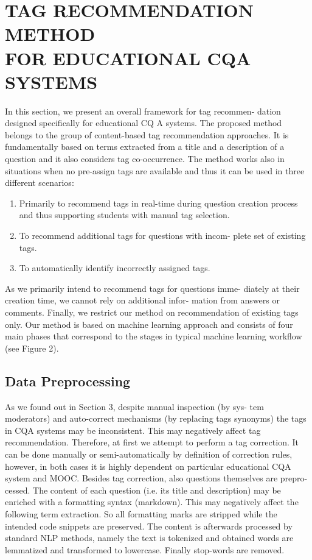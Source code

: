 \documentclass{sig-alternate}
\begin{document}
\section{TAG RECOMMENDATION METHOD \\ FOR
EDUCATIONAL CQA SYSTEMS}

In this section, we present an overall framework for tag recommen-
dation designed specifically for educational CQ A systems.
The proposed method belongs to the group of content-based tag
recommendation approaches. It is fundamentally based on terms
extracted from a title and a description of a question and it also
considers tag co-occurrence. The method works also in situations
when no pre-assign tags are available and thus it can be used in
three different scenarios:

\begin{enumerate}
\item Primarily to recommend tags in real-time during question
creation process and thus supporting students with manual
tag selection.
\item To recommend additional tags for questions with incom-
plete set of existing tags.
\item To automatically identify incorrectly assigned tags.
\end{enumerate}
As we primarily intend to recommend tags for questions imme-
diately at their creation time, we cannot rely on additional infor-
mation from answers or comments. Finally, we restrict our method
on recommendation of existing tags only.
Our method is based on machine learning approach and consists
of four main phases that correspond to the stages in typical machine
learning workflow (see Figure 2).

\subsection{Data Preprocessing}
As we found out in Section 3, despite manual inspection (by sys-
tem moderators) and auto-correct mechanisms (by replacing tags
synonyms) the tags in CQA systems may be inconsistent. This
may negatively affect tag recommendation. Therefore, at first we
attempt to perform a tag correction. It can be done manually or
semi-automatically by definition of correction rules, however, in
both cases it is highly dependent on particular educational CQA
system and MOOC.
Besides tag correction, also questions themselves are prepro-
cessed. The content of each question (i.e. its title and description)
may be enriched with a formatting syntax (markdown). This may
negatively affect the following term extraction. So all formatting
marks are stripped while the intended code snippets are preserved.
The content is afterwards processed by standard NLP methods,
namely the text is tokenized and obtained words are lemmatized
and transformed to lowercase. Finally stop-words are removed.
\end{document}
